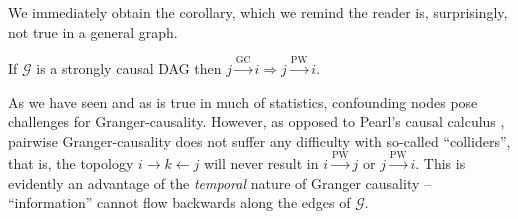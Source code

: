 \documentclass[12pt]{article}
\def\gc{\overset{\text{GC}}{\rightarrow}}  %
\def\pwgc{\overset{\text{PW}}{\rightarrow}}  %
\def\gcg{\mathcal{G}}  %
\def\VAR{\mathsf{VAR}}  %
\begin{document}
We immediately obtain the corollary, which we remind the reader is,
surprisingly, not true in a general graph.

\begin{corollary}
  \label{cor:gc_implies_pwgc}
  If $\gcg$ is a strongly causal DAG then $j \gc i \Rightarrow j \pwgc i$.
\end{corollary}

  


\begin{remark}
  As we have seen and as is true in much of statistics, confounding
  nodes pose challenges for Granger-causality.  However, as opposed to
  Pearl's causal calculus \cite{pearl2000art}, pairwise
  Granger-causality does not suffer any difficulty with so-called
  ``colliders'', that is, the topology $i \rightarrow k \leftarrow j$
  will never result in $i \pwgc j$ or $j \pwgc i$.  This is evidently
  an advantage of the \textit{temporal} nature of Granger causality --
  ``information'' cannot flow backwards along the edges of $\gcg$.
\end{remark}
\end{document}
